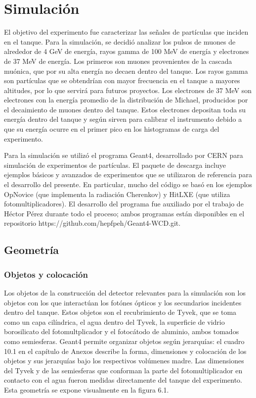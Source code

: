 \documentclass{book}
\begin{document}
\section{Simulaci\'on}
El objetivo del experimento fue caracterizar las se\~nales de part\'iculas que inciden en el tanque. Para la simulaci\'on, se decidi\'o analizar los pulsos de muones de alrededor de 4 GeV de energ\'ia, rayos gamma de 100 MeV de energ\'ia y electrones de 37 MeV de energ\'ia. Los primeros son muones provenientes de la cascada mu\'onica, que por su alta energ\'ia no decaen dentro del tanque. Los rayos gamma son part\'iculas que se obtendr\'ian con mayor frecuencia en el tanque a mayores altitudes, por lo que servir\'a para futuros proyectos. Los electrones de 37 MeV son electrones con la energ\'ia promedio de la distribuci\'on de Michael, producidos por el decaimiento de muones dentro del tanque. Estos electrones depositan toda su energ\'ia dentro del tanque y seg\'un \citep{ALLISON} sirven para calibrar el instrumento debido a que su energ\'ia ocurre en el primer pico en los histogramas de carga del experimento.

Para la simulaci\'on se utiliz\'o el programa Geant4, desarrollado por CERN para simulaci\'on de experimentos de part\'iculas. El paquete de descarga incluye ejemplos b\'asicos y avanzados de experimentos que se utilizaron de referencia para el desarrollo del presente. En particular, mucho del c\'odigo se bas\'o en los ejemplos OpNovice (que implementa la radiaci\'on Cherenkov) y HitLXE (que utiliza fotomultiplicadores). El desarrollo del programa fue auxiliado por el trabajo de H\'ector P\'erez durante todo el proceso; ambos programas est\'an disponibles en el repositorio https://github.com/hepfpeh/Geant4-WCD.git.
\subsection{Geometr\'ia}
\subsubsection{Objetos y colocaci\'on}

Los objetos de la construcci\'on del detector relevantes para la simulaci\'on son los objetos con los que interact\'uan los fot\'ones \'opticos y los secundarios incidentes dentro del tanque. Estos objetos son el recubrimiento de Tyvek, que se toma como un capa cil\'indrica, el agua dentro del Tyvek, la superficie de vidrio borosilicato del fotomultplicador y el fotoc\'atodo de aluminio, ambos tomados como semiesferas. Geant4 permite organizar objetos seg\'un jerarqu\'ias: el cuadro 10.1 en el cap\'itulo de Anexos describe la forma, dimensiones y colocaci\'on de los objetos y sus jerarqu\'ias bajo los respectivos vol\'umenes madre. Las dimensiones del Tyvek y de las semiesferas que conforman la parte del fotomultiplicador en contacto con el agua fueron medidas directamente del tanque del experimento. Esta geometr\'ia se expone visualmente en la figura 6.1.
\end{document}

